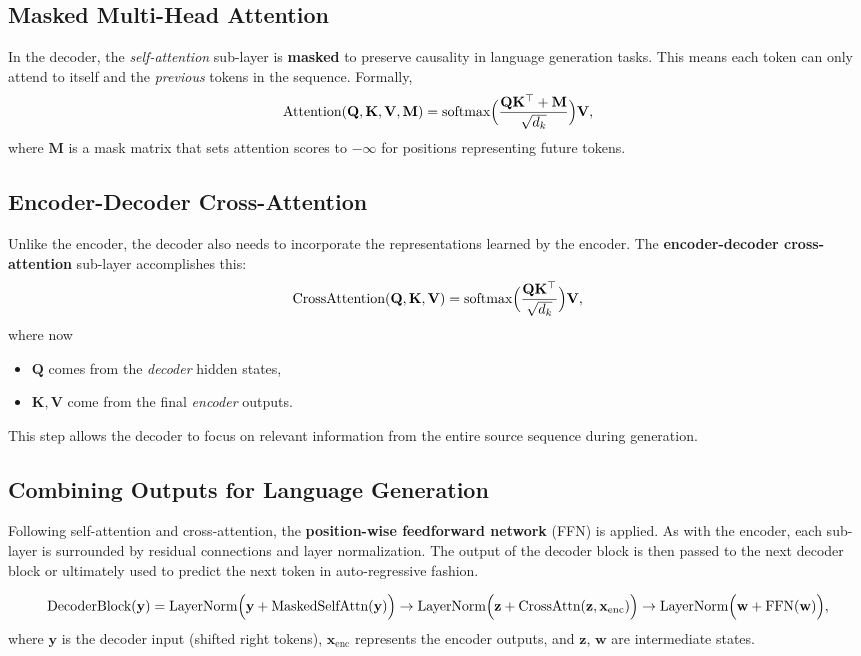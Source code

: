 \subsection{Masked Multi-Head Attention}
\noindent
In the decoder, the \emph{self-attention} sub-layer is \textbf{masked} to preserve causality in language generation tasks. This means each token can only attend to itself and the \emph{previous} tokens in the sequence. Formally,
\[
\text{Attention}(\mathbf{Q}, \mathbf{K}, \mathbf{V}, \mathbf{M}) 
= \text{softmax}\Bigl(\frac{\mathbf{Q}\mathbf{K}^\top + \mathbf{M}}{\sqrt{d_k}}\Bigr)\mathbf{V},
\]
where $\mathbf{M}$ is a mask matrix that sets attention scores to $-\infty$ for positions representing future tokens.

\subsection{Encoder-Decoder Cross-Attention}
\noindent
Unlike the encoder, the decoder also needs to incorporate the representations learned by the encoder. The \textbf{encoder-decoder cross-attention} sub-layer accomplishes this:
\[
\text{CrossAttention}(\mathbf{Q}, \mathbf{K}, \mathbf{V}) 
= \text{softmax}\Bigl(\frac{\mathbf{Q}\mathbf{K}^\top}{\sqrt{d_k}}\Bigr)\mathbf{V},
\]
where now
\begin{itemize}
    \item $\mathbf{Q}$ comes from the \emph{decoder} hidden states,
    \item $\mathbf{K}, \mathbf{V}$ come from the final \emph{encoder} outputs.
\end{itemize}
This step allows the decoder to focus on relevant information from the entire source sequence during generation.

\subsection{Combining Outputs for Language Generation}
\noindent
Following self-attention and cross-attention, the \textbf{position-wise feedforward network} (FFN) is applied. As with the encoder, each sub-layer is surrounded by residual connections and layer normalization. The output of the decoder block is then passed to the next decoder block or ultimately used to predict the next token in auto-regressive fashion.

\[
\text{DecoderBlock}(\mathbf{y}) = 
\text{LayerNorm}\Bigl(\mathbf{y} + \text{MaskedSelfAttn}(\mathbf{y})\Bigr)
\rightarrow
\text{LayerNorm}\Bigl(\mathbf{z} + \text{CrossAttn}(\mathbf{z}, \mathbf{x}_{\text{enc}})\Bigr)
\rightarrow
\text{LayerNorm}\Bigl(\mathbf{w} + \text{FFN}(\mathbf{w})\Bigr),
\]
where $\mathbf{y}$ is the decoder input (shifted right tokens), $\mathbf{x}_{\text{enc}}$ represents the encoder outputs, and $\mathbf{z}$, $\mathbf{w}$ are intermediate states.

